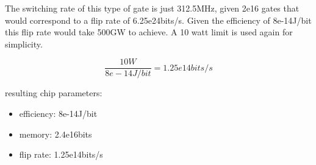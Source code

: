 \documentclass[a4paper]{article}
\begin{document}
	\medskip
	
	The switching rate of this type of gate is just 312.5MHz, given 2e16 gates that would correspond to a flip rate of 6.25e24bits/s. Given the efficiency of 8e-14J/bit this flip rate would take 500GW to achieve. A 10 watt limit is used again for simplicity.
	
	$$ \frac{10W}{8e-14J/bit} = 1.25e14bits/s$$
	
	resulting chip parameters:
	
	\begin{itemize}
		\item efficiency: 8e-14J/bit
		
		\item memory: 2.4e16bits
		
		\item flip rate: 1.25e14bits/s
	\end{itemize}
	
\end{document}
